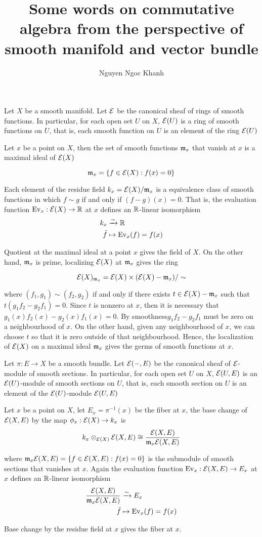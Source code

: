 \documentclass{report}
\title{
	Some words on commutative algebra from the perspective of smooth manifold and vector bundle
}
\author{Nguyen Ngoc Khanh}
\begin{document}
\maketitle

Let $X$ be a smooth manifold. Let $\mathcal{E}$ be the canonical sheaf of rings of smooth functions. In particular, for each open set $U$ on $X$, $\mathcal{E}(U)$ is a ring of smooth functions on $U$, that is, each smooth function on $U$ is an element of the ring $\mathcal{E}(U)$

Let $x$ be a point on $X$, then the set of smooth functions $\mathfrak{m}_x$ that vanish at $x$ is a maximal ideal of $\mathcal{E}(X)$

$$
	\mathfrak{m}_x = \{f \in \mathcal{E}(X): f(x) = 0\}
$$

Each element of the residue field $k_x = \mathcal{E}(X) / \mathfrak{m}_x$ is a equivalence class of smooth functions in which $f \sim g$ if and only if $(f - g)(x) = 0$. That is, the evaluation function $\operatorname{Ev}_x: \mathcal{E}(X) \to \mathbb{R}$ at $x$ defines an $\mathbb{R}$-linear isomorphism
\begin{align*}
	k_x &\xrightarrow{\sim} \mathbb{R} \\
	\bar{f} &\mapsto \operatorname{Ev}_x(f) = f(x)
\end{align*}

Quotient at the maximal ideal at a point $x$ gives the field of $X$. On the other hand, $\mathfrak{m}_x$ is prime, localizing $\mathcal{E}(X)$ at $\mathfrak{m}_x$ gives the ring

$$
	\mathcal{E}(X)_{\mathfrak{m}_x} = \mathcal{E}(X) \times (\mathcal{E}(X) - \mathfrak{m}_x) / \sim
$$

where $(f_1, g_1) \sim (f_2, g_2)$ if and only if there exists $t \in \mathcal{E}(X) - \mathfrak{m}_x$ such that $t(g_1 f_2 - g_2 f_1) = 0$. Since $t$ is nonzero at $x$, then it is necessary that $g_1(x) f_2(x) - g_2(x) f_1(x) = 0$. By smoothness$g_1 f_2 - g_2 f_1$ must be zero on a neighbourhood of $x$. On the other hand, given any neighbourhood of $x$, we can choose $t$ so that it is zero outside of that neighbourhood. Hence, the localization of $\mathcal{E}(X)$ on a maximal ideal $\mathfrak{m}_x$ gives the germs of smooth functions at $x$.

Let $\pi: E \to X$ be a smooth bundle. Let $\mathcal{E}(-, E)$ be the canonical sheaf of $\mathcal{E}$-module of smooth sections. In particular, for each open set $U$ on $X$, $\mathcal{E}(U, E)$ is an $\mathcal{E}(U)$-module of smooth sections on $U$, that is, each smooth section on $U$ is an element of the $\mathcal{E}(U)$-module $\mathcal{E}(U, E)$

Let $x$ be a point on $X$, let $E_x = \pi^{-1}(x)$ be the fiber at $x$, the base change of $\mathcal{E}(X, E)$ by the map $\phi_x: \mathcal{E}(X) \to k_x$ is
$$
	k_x \otimes_{\mathcal{E}(X)} \mathcal{E}(X, E) \cong \frac{\mathcal{E}(X, E)}{\mathfrak{m}_x \mathcal{E}(X, E)}
$$

where $\mathfrak{m}_x \mathcal{E}(X, E) = \{f \in \mathcal{E}(X, E): f(x) = 0\}$ is the submodule of smooth sections that vanishes at $x$. Again the evaluation function $\operatorname{Ev}_x: \mathcal{E}(X, E) \to E_x$ at $x$ defines an $\mathbb{R}$-linear isomorphism 
\begin{align*}
	 \frac{\mathcal{E}(X, E)}{\mathfrak{m}_x \mathcal{E}(X, E)} &\xrightarrow{\sim} E_x \\
	 \bar{f} &\mapsto \operatorname{Ev}_x(f) = f(x)
\end{align*}

Base change by the residue field at $x$ gives the fiber at $x$.
\end{document}
